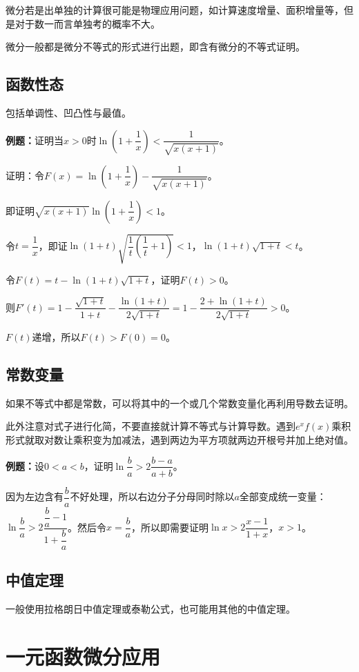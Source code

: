 微分若是出单独的计算很可能是物理应用问题，如计算速度增量、面积增量等，但是对于数一而言单独考的概率不大。

微分一般都是微分不等式的形式进行出题，即含有微分的不等式证明。

\subsection{函数性态}

包括单调性、凹凸性与最值。

\textbf{例题：}证明当$x>0$时$\ln\left(1+\dfrac{1}{x}\right)<\dfrac{1}{\sqrt{x(x+1)}}$。

证明：令$F(x)=\ln\left(1+\dfrac{1}{x}\right)-\dfrac{1}{\sqrt{x(x+1)}}$。

即证明$\sqrt{x(x+1)}\ln\left(1+\dfrac{1}{x}\right)<1$。

令$t=\dfrac{1}{x}$，即证$\ln(1+t)\sqrt{\dfrac{1}{t}\left(\dfrac{1}{t}+1\right)}<1$，$\ln(1+t)\sqrt{1+t}<t$。

令$F(t)=t-\ln(1+t)\sqrt{1+t}$，证明$F(t)>0$。\medskip

则$F'(t)=1-\dfrac{\sqrt{1+t}}{1+t}-\dfrac{\ln(1+t)}{2\sqrt{1+t}}=1-\dfrac{2+\ln(1+t)}{2\sqrt{1+t}}>0$。

$F(t)$递增，所以$F(t)>F(0)=0$。

\subsection{常数变量}

如果不等式中都是常数，可以将其中的一个或几个常数变量化再利用导数去证明。

此外注意对式子进行化简，不要直接就计算不等式与计算导数。遇到$e^xf(x)$乘积形式就取对数让乘积变为加减法，遇到两边为平方项就两边开根号并加上绝对值。

\textbf{例题：}设$0<a<b$，证明$\ln\dfrac{b}{a}>2\dfrac{b-a}{a+b}$。

因为左边含有$\dfrac{b}{a}$不好处理，所以右边分子分母同时除以$a$全部变成统一变量：$\ln\dfrac{b}{a}>2\dfrac{\dfrac{b}{a}-1}{1+\dfrac{b}{a}}$。然后令$x=\dfrac{b}{a}$，所以即需要证明$\ln x>2\dfrac{x-1}{1+x}$，$x>1$。

\subsection{中值定理}

一般使用拉格朗日中值定理或泰勒公式，也可能用其他的中值定理。

\section{一元函数微分应用}

